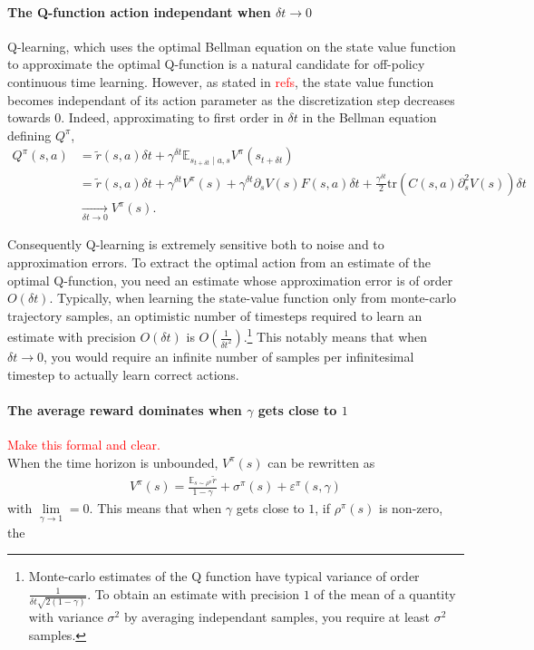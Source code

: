 \documentclass[11pt]{article}
\newcommand{\deltat}{{\delta t}}
\newcommand{\E}{\mathbb{E}}
\newcommand{\TODO}[1]{\textcolor{red}{#1}}
\newcommand{\bigO}[1]{O(#1)}
\begin{document}
\paragraph{The Q-function action independant when $\deltat \to 0$}
Q-learning, which uses the optimal Bellman equation on the state value function
to approximate the optimal Q-function is a natural candidate for off-policy
continuous time learning. However, as stated in \TODO{refs}, the state value function
becomes independant of its action parameter as the discretization step decreases towards
$0$. Indeed, approximating to first order in $\deltat$ in the Bellman equation defining
$Q^\pi$, 
\begin{align}
	Q^\pi(s, a) &= \tilde{r}(s, a)\deltat + \gamma^\deltat \E_{s_{t+\deltat} \mid a, s} 
	V^\pi(s_{t+\deltat})\nonumber\\
	&= \tilde{r}(s, a)\deltat + \gamma^\deltat V^\pi(s) + \gamma^\deltat \partial_s V(s) F(s, a) \deltat
	+ \frac{\gamma^\deltat}{2} \text{tr}\left(C(s, a)\partial^2_{s} V(s)\right) \deltat\nonumber\\
	&\to\limits_{\deltat \to 0} V^\pi(s).
\end{align}

Consequently Q-learning is extremely sensitive both to noise and to approximation errors.
To extract the optimal action from an estimate of the optimal Q-function, you need an estimate
whose approximation error is of order $\bigO{\deltat}$.
Typically, when learning the state-value function only from monte-carlo trajectory samples, 
an optimistic number of timesteps required to learn an estimate with precision $\bigO{\deltat}$ is
$\bigO{\frac{1}{\deltat^2}}$.\footnote{
	Monte-carlo estimates of the Q function have typical variance of order
	$\frac{1}{\deltat\sqrt{2(1 - \gamma)}}$. To obtain an estimate with precision $1$ of the mean
	of a quantity with variance $\sigma^2$ by averaging independant samples, you
	require at least $\sigma^2$ samples.}
This notably means that when $\deltat \to 0$, you would require an infinite number of samples
per infinitesimal timestep to actually learn correct actions.

\paragraph{The average reward dominates when $\gamma$ gets close to $1$}
\TODO{Make this formal and clear.}\\
When the time horizon is unbounded, $V^\pi(s)$ can be rewritten as
\begin{align}
	V^\pi(s) = \frac{\E_{s\sim\rho^\pi}\tilde{r}}{1 - \gamma} +
	\sigma^\pi(s) + \varepsilon^\pi(s, \gamma)
\end{align}
with $\lim\limits_{\gamma\to 1} = 0$. This means that when $\gamma$ gets close to $1$,
if $\rho^\pi(s)$ is non-zero, the 
\end{document}
